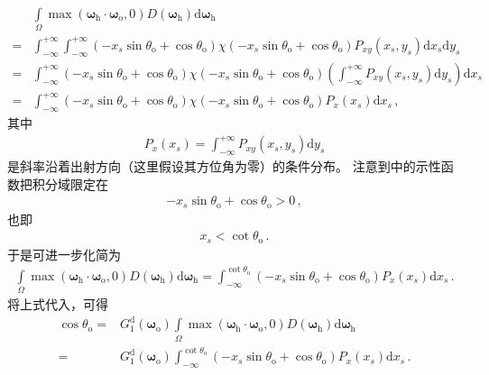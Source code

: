 \begin{align}\label{eq:08-ex01-trans-1d-slope}
      & \int\limits_{\varOmega}\max({\bm\omega}_{\mathrm{h}}\cdot{\bm\omega}_{\mathrm{o}},0)
    D({\bm\omega}_{\mathrm{h}})\mathrm{d}{\bm\omega}_{\mathrm{h}}\nonumber                   \\
    = & \int_{-\infty}^{+\infty}\int_{-\infty}^{+\infty}
    (-x_s\sin\theta_{\mathrm{o}}+\cos\theta_{\mathrm{o}})
    \chi(-x_s\sin\theta_{\mathrm{o}}+\cos\theta_{\mathrm{o}})
    P_{xy}(x_s,y_s)\mathrm{d}x_s\mathrm{d}y_s\nonumber                                       \\
    = & \displaystyle\int_{-\infty}^{+\infty}
    (-x_s\sin\theta_{\mathrm{o}}+\cos\theta_{\mathrm{o}})
    \chi(-x_s\sin\theta_{\mathrm{o}}+\cos\theta_{\mathrm{o}})
    \left(\int_{-\infty}^{+\infty}P_{xy}(x_s,y_s)\mathrm{d}y_s\right)\mathrm{d}x_s\nonumber  \\
    = & \displaystyle\int_{-\infty}^{+\infty}
    (-x_s\sin\theta_{\mathrm{o}}+\cos\theta_{\mathrm{o}})
    \chi(-x_s\sin\theta_{\mathrm{o}}+\cos\theta_{\mathrm{o}})P_x(x_s)\mathrm{d}x_s\, ,
\end{align}
其中
\begin{align}
    P_x(x_s)=\int_{-\infty}^{+\infty}P_{xy}(x_s,y_s)\mathrm{d}y_s
\end{align}
是斜率沿着出射方向（这里假设其方位角为零）的条件分布。
注意到中的示性函数把积分域限定在
\begin{align}
    -x_s\sin\theta_{\mathrm{o}}+\cos\theta_{\mathrm{o}}>0\, ,
\end{align}
也即
\begin{align}
    x_s<\cot\theta_{\mathrm{o}}\, .
\end{align}
于是可进一步化简为
\begin{align}
    \int\limits_{\varOmega}\max({\bm\omega}_{\mathrm{h}}\cdot{\bm\omega}_{\mathrm{o}},0)
    D({\bm\omega}_{\mathrm{h}})\mathrm{d}{\bm\omega}_{\mathrm{h}}
    =\int_{-\infty}^{\cot\theta_{\mathrm{o}}}
    (-x_s\sin\theta_{\mathrm{o}}+\cos\theta_{\mathrm{o}})P_x(x_s)\mathrm{d}x_s\, .
\end{align}
将上式代入，可得
\begin{align}
    \cos\theta_{\mathrm{o}}
    = & G_1^{\mathrm{d}}({\bm\omega}_{\mathrm{o}})
    \int\limits_{\varOmega}\max({\bm\omega}_{\mathrm{h}}\cdot{\bm\omega}_{\mathrm{o}},0)
    D({\bm\omega}_{\mathrm{h}})\mathrm{d}{\bm\omega}_{\mathrm{h}}\nonumber \\
    = & G_1^{\mathrm{d}}({\bm\omega}_{\mathrm{o}})
    \int_{-\infty}^{\cot\theta_{\mathrm{o}}}
    (-x_s\sin\theta_{\mathrm{o}}+\cos\theta_{\mathrm{o}})P_x(x_s)\mathrm{d}x_s\, .
\end{align}
